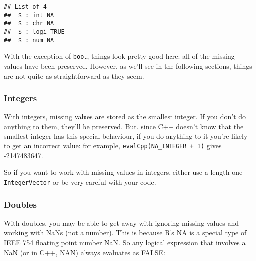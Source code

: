 \begin{Shaded}
\begin{Highlighting}[]
\NormalTok{(}\NormalTok{())}
\end{Highlighting}
\end{Shaded}

\begin{verbatim}
## List of 4
##  $ : int NA
##  $ : chr NA
##  $ : logi TRUE
##  $ : num NA
\end{verbatim}

With the exception of \texttt{bool}, things look pretty good here: all
of the missing values have been preserved. However, as we'll see in the
following sections, things are not quite as straightforward as they
seem.

\hypertarget{integers}{%
\subsubsection{Integers}\label{integers}}

With integers, missing values are stored as the smallest integer. If you
don't do anything to them, they'll be preserved. But, since C++ doesn't
know that the smallest integer has this special behaviour, if you do
anything to it you're likely to get an incorrect value: for example,
\texttt{evalCpp(\textquotesingle{}NA\_INTEGER\ +\ 1\textquotesingle{})}
gives -2147483647.

So if you want to work with missing values in integers, either use a
length one \texttt{IntegerVector} or be very careful with your code.

\hypertarget{doubles}{%
\subsubsection{Doubles}\label{doubles}}

With doubles, you may be able to get away with ignoring missing values
and working with NaNs (not a number). This is because R's NA is a
special type of IEEE 754 floating point number NaN. So any logical
expression that involves a NaN (or in C++, NAN) always evaluates as
FALSE:

\begin{Shaded}
\begin{Highlighting}[]
\NormalTok{(}\NormalTok{)}
\end{Highlighting}
\end{Shaded}

